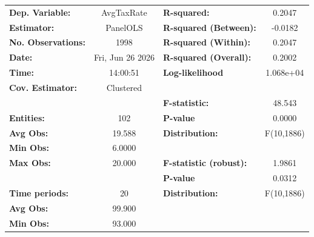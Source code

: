 \begin{center}
\begin{tabular}{lclc}
\toprule
\textbf{Dep. Variable:}                            &     AvgTaxRate     & \textbf{  R-squared:         }   &      0.2047      \\
\textbf{Estimator:}                                &      PanelOLS      & \textbf{  R-squared (Between):}  &     -0.0182      \\
\textbf{No. Observations:}                         &        1998        & \textbf{  R-squared (Within):}   &      0.2047      \\
\textbf{Date:}                                     &  Fri, Jun 26 2026  & \textbf{  R-squared (Overall):}  &      0.2002      \\
\textbf{Time:}                                     &      14:00:51      & \textbf{  Log-likelihood     }   &    1.068e+04     \\
\textbf{Cov. Estimator:}                           &     Clustered      & \textbf{                     }   &                  \\
\textbf{}                                          &                    & \textbf{  F-statistic:       }   &      48.543      \\
\textbf{Entities:}                                 &        102         & \textbf{  P-value            }   &      0.0000      \\
\textbf{Avg Obs:}                                  &       19.588       & \textbf{  Distribution:      }   &    F(10,1886)    \\
\textbf{Min Obs:}                                  &       6.0000       & \textbf{                     }   &                  \\
\textbf{Max Obs:}                                  &       20.000       & \textbf{  F-statistic (robust):} &      1.9861      \\
\textbf{}                                          &                    & \textbf{  P-value            }   &      0.0312      \\
\textbf{Time periods:}                             &         20         & \textbf{  Distribution:      }   &    F(10,1886)    \\
\textbf{Avg Obs:}                                  &       99.900       & \textbf{                     }   &                  \\
\textbf{Min Obs:}                                  &       93.000       & \textbf{                     }   &                  \\

\end{tabular}
\end{center}
